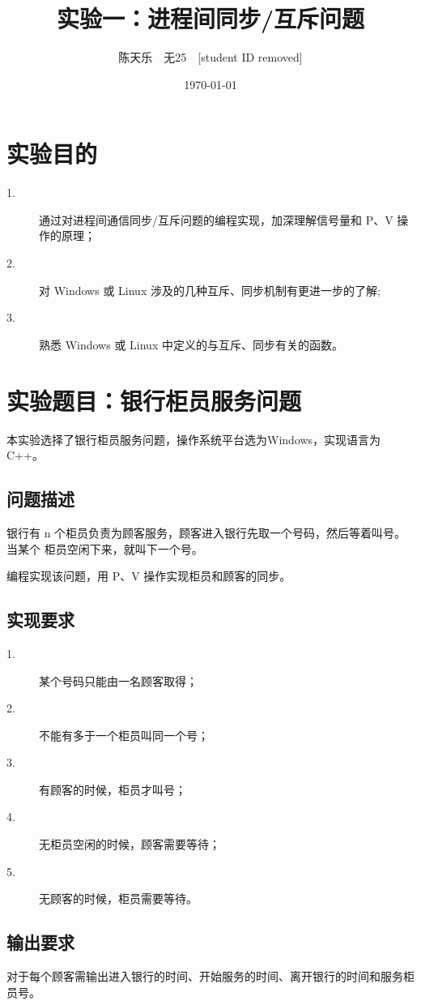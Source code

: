 \documentclass[UTF8]{ctexart}
\title{\textbf{实验一：进程间同步/互斥问题}}
\author{陈天乐\ \ 无25\ \ [student ID removed] }
\date{\today}
\begin{document}
\maketitle
\tableofcontents
\newpage
\section{实验目的}
\begin{description}
    \item[1.] 通过对进程间通信同步/互斥问题的编程实现，加深理解信号量和 P、V 操作的原理；
    \item[2.]  对 Windows 或 Linux 涉及的几种互斥、同步机制有更进一步的了解;
    \item[3.]  熟悉 Windows 或 Linux 中定义的与互斥、同步有关的函数。
\end{description}

\section{实验题目：银行柜员服务问题}
本实验选择了银行柜员服务问题，操作系统平台选为Windows，实现语言为C++。

\subsection{问题描述}
银行有 n 个柜员负责为顾客服务，顾客进入银行先取一个号码，然后等着叫号。当某个
柜员空闲下来，就叫下一个号。

编程实现该问题，用 P、V 操作实现柜员和顾客的同步。

\subsection{实现要求}
\begin{description}
    \item[1.] 某个号码只能由一名顾客取得；
    \item[2.] 不能有多于一个柜员叫同一个号；
    \item[3.] 有顾客的时候，柜员才叫号；
    \item[4.] 无柜员空闲的时候，顾客需要等待；
    \item[5.] 无顾客的时候，柜员需要等待。
\end{description}

\subsection{输出要求}
对于每个顾客需输出进入银行的时间、开始服务的时间、离开银行的时间和服务柜员号。
\end{document}
